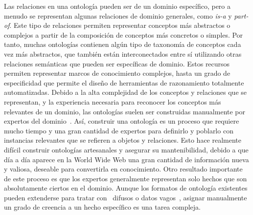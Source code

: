 Las relaciones en una ontología pueden ser de un dominio específico, pero a menudo se representan algunas relaciones de dominio generales, como \textit{is-a} y \textit{part-of}. Este tipo de relaciones permiten representar conceptos más abstractos o complejos a partir de la composición de conceptos más concretos o simples. 
Por tanto, muchas ontologías contienen algún tipo de taxonomía de conceptos cada vez más abstractos, que también están interconectados entre sí utilizando otras relaciones semánticas que pueden ser específicas de dominio.
Estos recursos permiten representar marcos de conocimiento complejos, hasta un grado de especificidad que permite el diseño de herramientas de razonamiento totalmente automatizadas.
Debido a la alta complejidad de los conceptos y relaciones que se representan, y la experiencia necesaria para reconocer los conceptos más relevantes de un dominio, las ontologías suelen ser construidas manualmente por expertos del dominio~\cite{wong2012ontology}. 
Así, construir una ontología es un proceso que requiere mucho tiempo y una gran cantidad de expertos para definirlo y poblarlo con instancias relevantes que se refieren a objetos y relaciones. 
Esto hace realmente difícil construir ontologías artesanales y asegurar su mantenibilidad, debido a que día a día aparece en la World Wide Web una gran cantidad de información nueva y valiosa, deseable para convertirla en conocimiento. 
Otro resultado importante de este proceso es que los expertos generalmente representan solo hechos que son absolutamente ciertos en el dominio. Aunque los formatos de ontología existentes pueden extenderse para tratar con~\cite{fuzzyontology} difusos o datos vagos~\cite{bobillo2011fuzzy}, asignar manualmente un grado de creencia a un hecho específico es una tarea compleja.

